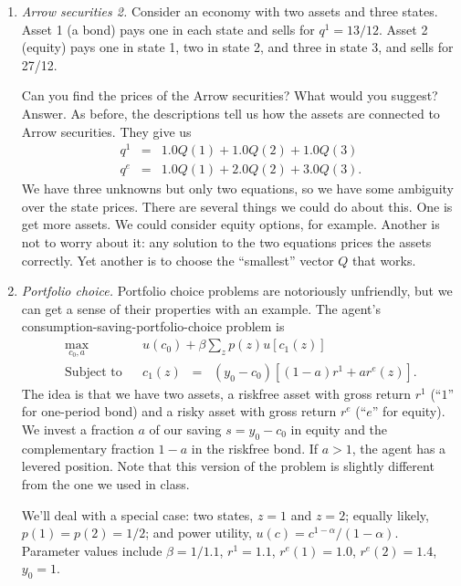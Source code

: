 \begin{enumerate}
\item {\it Arrow securities 2.\/}
Consider an economy with two assets and three states.
Asset 1 (a bond) pays one in each state and sells for $q^1 = 13/12$.
Asset 2 (equity) pays one in state 1, two in state 2, and three in state 3,
and sells for 27/12.

Can you find the prices of the Arrow securities?
What would you suggest?
%
Answer.
As before, the descriptions tell us how the assets are connected to Arrow securities.
They give us
\begin{eqnarray*}
    q^1 &=& 1.0 Q(1) + 1.0 Q(2) + 1.0 Q(3) \\
    q^e &=& 1.0 Q(1) + 2.0 Q(2) + 3.0 Q(3) .
\end{eqnarray*}
We have three unknowns but only two equations, so we have some ambiguity over
the state prices.
There are several things we could do about this.
One is get more assets.  We could consider equity options, for example.
Another is not to worry about it:  any solution to the two equations prices
the assets correctly.
Yet another is to choose the ``smallest'' vector $Q$ that works.

\item {\it Portfolio choice.\/}
Portfolio choice problems are notoriously unfriendly,
but we can get a sense of their properties with an example.
The agent's consumption-saving-portfolio-choice problem is
\begin{eqnarray*}
   \max_{c_0, a} &&  u(c_0) + \beta \sum_z p(z) u[c_1(z)] \\
   \mbox{Subject to} &&  c_1(z)\;\;=\;\; (y_0-c_0)[(1-a) r^1 + a r^e(z)] .
\end{eqnarray*}
The idea is that we have two assets,
a riskfree asset with gross return $r^1$ (``$1$'' for one-period bond)
and a risky asset with gross return $r^e$  (``$e$'' for equity).
We invest a fraction $a$ of our saving $s = y_0 - c_0$
in equity and the complementary
fraction $1-a$ in the riskfree bond.
If $a>1$, the agent has a levered position.
Note that this version of the problem is slightly different from the one we used in class.

We'll deal with a special case:
two states, $z=1$ and $z=2$;
equally likely, $p(1) = p(2) = 1/2$;
and power utility, $u(c) = c^{1-\alpha}/(1-\alpha)$.
Parameter values include
$\beta = 1/1.1$,
$r^1 = 1.1$,
$r^e(1) = 1.0$, $r^e(2) = 1.4$,
$ y_0 = 1$.


\end{enumerate}
